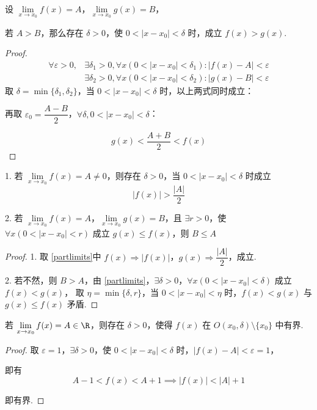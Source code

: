 \begin{proposition}
	设 $\lim\limits_{x \to x_0} f(x) = A$，$\lim\limits_{x \to x_0} g(x) = B$，
	
	若 $A > B$，那么存在 $\delta > 0$，使 $0 < |x - x_0| < \delta$ 时，成立 $f(x) > g(x)$.
	\label{partlimits}
\end{proposition}
\begin{proof}
	$$\begin{aligned}
		\forall \varepsilon > 0,&\exists \delta_1 > 0,\forall x (0 < |x - x_0| < \delta_1): |f(x) - A| < \varepsilon\\
		&\exists \delta_2 > 0,\forall x (0 < |x - x_0| < \delta_2): |g(x) - B| < \varepsilon
	\end{aligned}$$
	取 $\delta = \min\{\delta_1, \delta_2\}$，当 $0 < |x - x_0| < \delta$ 时，以上两式同时成立：
	
	再取 $\varepsilon_0 = \dfrac{A - B}{2}$，$\forall \delta, 0 < |x - x_0| < \delta$：
	
	\[
	g(x) < \frac{A + B}{2} < f(x)
	\]
	
\end{proof}
\begin{corollary}
	1. 若 $\lim\limits_{x \to x_0} f(x) = A \neq 0$，则存在 $\delta > 0$，当 $0 < |x - x_0| < \delta$ 时成立
	\[
	|f(x)| > \frac{|A|}{2}
	\]
	
	2. 若 $\lim\limits_{x \to x_0} f(x) = A$，$\lim\limits_{x \to x_0} g(x) = B$，且 $\exists r > 0$，使 $\forall x (0 < |x - x_0| < r)$ 成立 $g(x) \leqslant f(x)$，则 $B \leqslant A$
\end{corollary}
\begin{proof}
	1. 取 \ref{partlimits}中 $f(x) \Rightarrow |f(x)|$，$g(x) \Rightarrow \dfrac{|A|}{2}$，成立.
	
	2. 若不然，则 $B > A$，由 \ref{partlimits}，$\exists \delta > 0$，$\forall x (0 < |x - x_0| < \delta)$ 成立 $f(x) < g(x)$，
	取 $\eta = \min\{\delta, r\}$，当 $0 < |x - x_0| < \eta$ 时，$f(x) < g(x)$ 与 $g(x) \leqslant f(x)$ 矛盾.
	
\end{proof}
\begin{proposition}
	若 $\lim\limits_{x \to x_0} f(x) = A\in\R$，则存在 $\delta > 0$，使得 $f(x)$ 在 $O(x_0, \delta) \setminus \{x_0\}$ 中有界.
\end{proposition}
\begin{proof}
	取 $\varepsilon = 1$，$\exists \delta > 0$，使 $0 < |x - x_0| < \delta$ 时，$|f(x) - A| < \varepsilon = 1$，
	
	即有
	\[
	A - 1 < f(x) < A + 1 \implies |f(x)| < |A| + 1
	\]
	
	即有界.
\end{proof}
